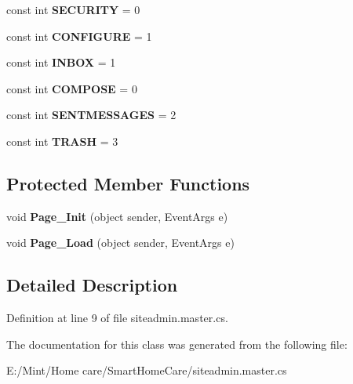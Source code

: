 \begin{DoxyCompactItemize}
\item 
\hypertarget{classsiteadmin_a85450122969cdfad519bee71563fbf75}{const int {\bfseries S\-E\-C\-U\-R\-I\-T\-Y} = 0}\label{classsiteadmin_a85450122969cdfad519bee71563fbf75}

\item 
\hypertarget{classsiteadmin_ab1897f2ca6c9fc6c85d3e0f53bb95622}{const int {\bfseries C\-O\-N\-F\-I\-G\-U\-R\-E} = 1}\label{classsiteadmin_ab1897f2ca6c9fc6c85d3e0f53bb95622}

\item 
\hypertarget{classsiteadmin_a3e1e569a5a86ecb0ed6f01b8fb529219}{const int {\bfseries I\-N\-B\-O\-X} = 1}\label{classsiteadmin_a3e1e569a5a86ecb0ed6f01b8fb529219}

\item 
\hypertarget{classsiteadmin_a608eb6bff3a2afa7469e2923f27976a4}{const int {\bfseries C\-O\-M\-P\-O\-S\-E} = 0}\label{classsiteadmin_a608eb6bff3a2afa7469e2923f27976a4}

\item 
\hypertarget{classsiteadmin_a607040133edce9c856a173d4d11038eb}{const int {\bfseries S\-E\-N\-T\-M\-E\-S\-S\-A\-G\-E\-S} = 2}\label{classsiteadmin_a607040133edce9c856a173d4d11038eb}

\item 
\hypertarget{classsiteadmin_a52cd2fb7538e06f9bd3309eb3fdf3843}{const int {\bfseries T\-R\-A\-S\-H} = 3}\label{classsiteadmin_a52cd2fb7538e06f9bd3309eb3fdf3843}

\end{DoxyCompactItemize}
\subsection*{Protected Member Functions}
\begin{DoxyCompactItemize}
\item 
\hypertarget{classsiteadmin_aff7f38e8dcd84e3c31fc6dd7cf2e5e22}{void {\bfseries Page\-\_\-\-Init} (object sender, Event\-Args e)}\label{classsiteadmin_aff7f38e8dcd84e3c31fc6dd7cf2e5e22}

\item 
\hypertarget{classsiteadmin_a57862374666f9bb2bf16c5b5683b24a3}{void {\bfseries Page\-\_\-\-Load} (object sender, Event\-Args e)}\label{classsiteadmin_a57862374666f9bb2bf16c5b5683b24a3}

\end{DoxyCompactItemize}


\subsection{Detailed Description}


Definition at line 9 of file siteadmin.\-master.\-cs.



The documentation for this class was generated from the following file\-:\begin{DoxyCompactItemize}
\item 
E\-:/\-Mint/\-Home care/\-Smart\-Home\-Care/siteadmin.\-master.\-cs\end{DoxyCompactItemize}
